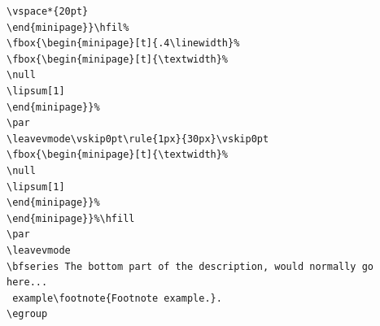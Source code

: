 \begin{commands}[]{}
\begin{verbatim}
\vspace*{20pt}
\end{minipage}}\hfil%
\fbox{\begin{minipage}[t]{.4\linewidth}%
\fbox{\begin{minipage}[t]{\textwidth}%
\null
\lipsum[1]
\end{minipage}}%
\par
\leavevmode\vskip0pt\rule{1px}{30px}\vskip0pt
\fbox{\begin{minipage}[t]{\textwidth}%
\null
\lipsum[1]
\end{minipage}}%
\end{minipage}}%\hfill
\par
\leavevmode
\bfseries The bottom part of the description, would normally go here... 
 example\footnote{Footnote example.}.
\egroup
\end{verbatim}
\end{commands}